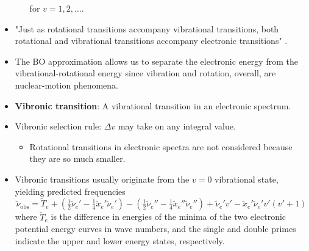 \documentclass[../notes.tex]{subfiles}
\begin{document}
\begin{itemize}
\begin{itemize}
\begin{equation*}
        \end{equation*}
        for $v=1,2,\dots$.
    \end{itemize}
    \item "Just as rotational transitions accompany vibrational transitions, both rotational and vibrational transitions accompany electronic transitions" \parencite[507]{bib:McQuarrieSimon}.
    \item The BO approximation allows us to separate the electronic energy from the vibrational-rotational energy since vibration and rotation, overall, are nuclear-motion phenomena.
    \item \textbf{Vibronic transition}: A vibrational transition in an electronic spectrum.
    \item Vibronic selection rule: $\Delta v$ may take on any integral value.
    \begin{itemize}
        \item Rotational transitions in electronic spectra are not considered because they are so much smaller.
    \end{itemize}
    \item Vibronic transitions usually originate from the $v=0$ vibrational state, yielding predicted frequencies
    \begin{equation*}
        \tilde{\nu}_\text{obs} = \tilde{T}_e+(\tfrac{1}{2}\tilde{\nu}_e'-\tfrac{1}{4}\tilde{x}_e'\tilde{\nu}_e')-(\tfrac{1}{2}\tilde{\nu}_e''-\tfrac{1}{4}\tilde{x}_e''\tilde{\nu}_e'')+\tilde{\nu}_e'v'-\tilde{x}_e'\tilde{\nu}_e'v'(v'+1)
    \end{equation*}
    where $\tilde{T}_e$ is the difference in energies of the minima of the two electronic potential energy curves in wave numbers, and the single and double primes indicate the upper and lower energy states, respectively.
    \begin{figure}[h!]
        \centering
\end{figure}
\end{itemize}
\end{document}
